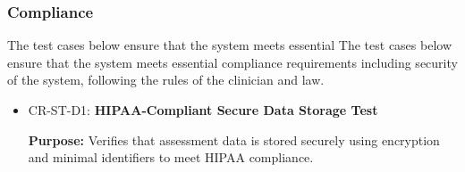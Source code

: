 \documentclass[12pt, titlepage]{article}
\begin{document}
\begin{itemize}
\end{itemize}

\subsubsection{Compliance}

The test cases below ensure that the system meets essential 
The test cases below ensure that the system meets essential 
compliance requirements including security of the system, following the rules of the clinician and law.


\begin{itemize}

  \item CR-ST-D1: \textbf{HIPAA-Compliant Secure Data Storage Test}
  \begin{mdframed}[linewidth=0.5mm]
      \textbf{Purpose:} Verifies that assessment data is stored securely using encryption and minimal identifiers to meet HIPAA compliance. \par


\end{mdframed}
\end{itemize}
\end{document}
